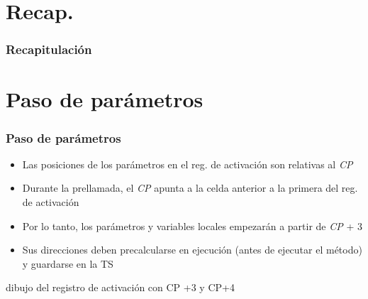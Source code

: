 \documentclass[hyperref={pdfpagelabels=false},tree-dvips,compress]{beamer}
\begin{document}
\section{Recap.}
\begin{frame}[fragile]
\frametitle{Recapitulación}
	\scriptsize\tableofcontents
\end{frame}
\section{Paso de parámetros}
\begin{frame}[fragile]
\frametitle{Paso de parámetros}

\begin{itemize}[<+->]
	\item Las posiciones de los parámetros en el reg. de activación son relativas al \emph{CP}
	\item Durante la prellamada, el \emph{CP} apunta a la celda anterior a la primera del reg. de activación
	\item Por lo tanto, los parámetros y variables locales empezarán a partir de \emph{CP} + 3
	\item Sus direcciones deben precalcularse en ejecución (antes de ejecutar el método) y guardarse en la TS
\end{itemize}


dibujo del registro de activación con CP +3 y CP+4

\end{frame}
\end{document}
